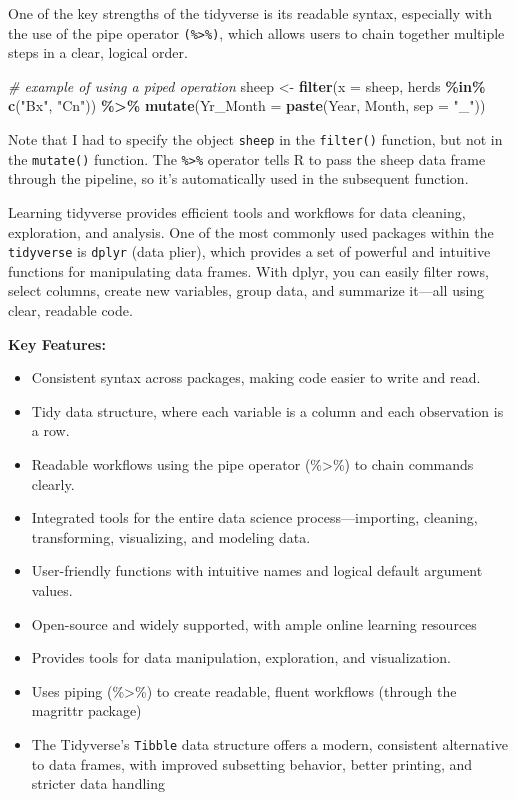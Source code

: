 \documentclass[
]{book}
\newenvironment{Shaded}{\begin{snugshade}}{\end{snugshade}}
\newcommand{\AttributeTok}[1]{\textcolor[rgb]{0.13,0.29,0.53}{#1}}
\newcommand{\CommentTok}[1]{\textcolor[rgb]{0.56,0.35,0.01}{\textit{#1}}}
\newcommand{\FunctionTok}[1]{\textcolor[rgb]{0.13,0.29,0.53}{\textbf{#1}}}
\newcommand{\NormalTok}[1]{#1}
\newcommand{\OtherTok}[1]{\textcolor[rgb]{0.56,0.35,0.01}{#1}}
\newcommand{\SpecialCharTok}[1]{\textcolor[rgb]{0.81,0.36,0.00}{\textbf{#1}}}
\newcommand{\StringTok}[1]{\textcolor[rgb]{0.31,0.60,0.02}{#1}}
\providecommand{\tightlist}{%
  \setlength{\itemsep}{0pt}\setlength{\parskip}{0pt}}
\begin{document}
One of the key strengths of the tidyverse is its readable syntax, especially with the use of the pipe operator \texttt{(\%\textgreater{}\%)}, which allows users to chain together multiple steps in a clear, logical order.

\begin{Shaded}
\begin{Highlighting}[]
\CommentTok{\# example of using a piped operation}
\NormalTok{sheep }\OtherTok{\textless{}{-}} \FunctionTok{filter}\NormalTok{(}\AttributeTok{x =}\NormalTok{ sheep, herds }\SpecialCharTok{\%in\%} \FunctionTok{c}\NormalTok{(}\StringTok{"Bx"}\NormalTok{, }\StringTok{"Cn"}\NormalTok{)) }\SpecialCharTok{\%\textgreater{}\%}
  \FunctionTok{mutate}\NormalTok{(}\AttributeTok{Yr\_Month =} \FunctionTok{paste}\NormalTok{(Year, Month, }\AttributeTok{sep =} \StringTok{"\_"}\NormalTok{))}
\end{Highlighting}
\end{Shaded}

Note that I had to specify the object \texttt{sheep} in the \texttt{filter()} function, but not in the \texttt{mutate()} function. The \texttt{\%\textgreater{}\%} operator tells R to pass the sheep data frame through the pipeline, so it's automatically used in the subsequent function.

Learning tidyverse provides efficient tools and workflows for data cleaning, exploration, and analysis. One of the most commonly used packages within the \texttt{tidyverse} is \texttt{dplyr} (data plier), which provides a set of powerful and intuitive functions for manipulating data frames. With dplyr, you can easily filter rows, select columns, create new variables, group data, and summarize it---all using clear, readable code.

\textbf{Key Features:}

\begin{itemize}
\tightlist
\item
  Consistent syntax across packages, making code easier to write and read.
\item
  Tidy data structure, where each variable is a column and each observation is a row.
\item
  Readable workflows using the pipe operator (\%\textgreater\%) to chain commands clearly.
\item
  Integrated tools for the entire data science process---importing, cleaning, transforming, visualizing, and modeling data.
\item
  User-friendly functions with intuitive names and logical default argument values.
\item
  Open-source and widely supported, with ample online learning resources
\item
  Provides tools for data manipulation, exploration, and visualization.
\item
  Uses piping (\%\textgreater\%) to create readable, fluent workflows (through the magrittr package)
\item
  The Tidyverse's \texttt{Tibble} data structure offers a modern, consistent alternative to data frames, with improved subsetting behavior, better printing, and stricter data handling
\end{itemize}
\end{document}
